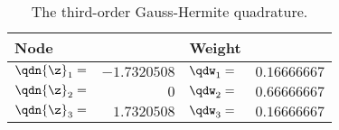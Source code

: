 \begin{table}[t]
  \vspace{0.5em}
  \centering
  \caption{The third-order Gauss-Hermite quadrature.}
  \begin{tabular}{lrll}
    \toprule
    Node & & Weight & \\
    \midrule
    $\qdn{\z}_1 = $ & $-1.7320508$ & $\qdw_1 = $ & $0.16666667$ \\
    $\qdn{\z}_2 = $ & $         0$ & $\qdw_2 = $ & $0.66666667$ \\
    $\qdn{\z}_3 = $ & $ 1.7320508$ & $\qdw_3 = $ & $0.16666667$ \\
    \bottomrule
  \end{tabular}
\end{table}
